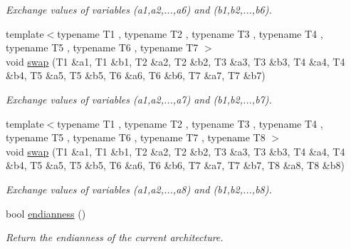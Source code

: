 \begin{DoxyCompactItemize}
\begin{DoxyCompactList}\small\item\em Exchange values of variables ({\ttfamily a1},{\ttfamily a2},...,{\ttfamily a6}) and ({\ttfamily b1},{\ttfamily b2},...,{\ttfamily b6}). \end{DoxyCompactList}\item 
\mbox{\label{namespacecimg__library__suffixed_1_1cimg_aca980117982a98452e2106fda638def1}} 
{\footnotesize template$<$typename T1 , typename T2 , typename T3 , typename T4 , typename T5 , typename T6 , typename T7 $>$ }\\void \hyperlink{namespacecimg__library__suffixed_1_1cimg_aca980117982a98452e2106fda638def1}{swap} (T1 \&a1, T1 \&b1, T2 \&a2, T2 \&b2, T3 \&a3, T3 \&b3, T4 \&a4, T4 \&b4, T5 \&a5, T5 \&b5, T6 \&a6, T6 \&b6, T7 \&a7, T7 \&b7)
\begin{DoxyCompactList}\small\item\em Exchange values of variables ({\ttfamily a1},{\ttfamily a2},...,{\ttfamily a7}) and ({\ttfamily b1},{\ttfamily b2},...,{\ttfamily b7}). \end{DoxyCompactList}\item 
\mbox{\label{namespacecimg__library__suffixed_1_1cimg_a2f261b2759f7ba63c4bc84267d5a20c8}} 
{\footnotesize template$<$typename T1 , typename T2 , typename T3 , typename T4 , typename T5 , typename T6 , typename T7 , typename T8 $>$ }\\void \hyperlink{namespacecimg__library__suffixed_1_1cimg_a2f261b2759f7ba63c4bc84267d5a20c8}{swap} (T1 \&a1, T1 \&b1, T2 \&a2, T2 \&b2, T3 \&a3, T3 \&b3, T4 \&a4, T4 \&b4, T5 \&a5, T5 \&b5, T6 \&a6, T6 \&b6, T7 \&a7, T7 \&b7, T8 \&a8, T8 \&b8)
\begin{DoxyCompactList}\small\item\em Exchange values of variables ({\ttfamily a1},{\ttfamily a2},...,{\ttfamily a8}) and ({\ttfamily b1},{\ttfamily b2},...,{\ttfamily b8}). \end{DoxyCompactList}\item 
bool \hyperlink{namespacecimg__library__suffixed_1_1cimg_afd898f29e094a625d15928ed19a6b69d}{endianness} ()
\begin{DoxyCompactList}\small\item\em Return the endianness of the current architecture. \end{DoxyCompactList}\item 

\end{DoxyCompactItemize}
